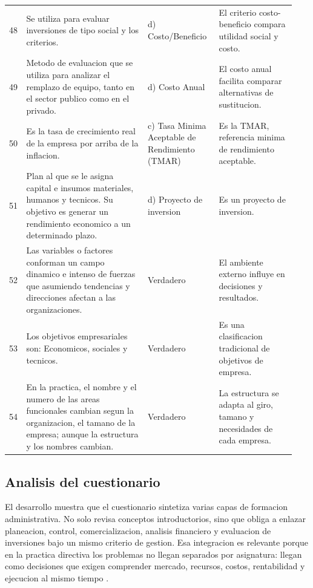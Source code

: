 \documentclass[
	spanish,
	letterpaper, oneside
]{article}
\begin{document}
\begin{landscape}
\begin{longtable}{@{}L{0.03\linewidth}L{0.41\linewidth}L{0.24\linewidth}L{0.26\linewidth}@{}}
48 & Se utiliza para evaluar inversiones de tipo social y los criterios. & d) Costo/Beneficio & El criterio costo-beneficio compara utilidad social y costo. \\
49 & Metodo de evaluacion que se utiliza para analizar el remplazo de equipo, tanto en el sector publico como en el privado. & d) Costo Anual & El costo anual facilita comparar alternativas de sustitucion. \\
50 & Es la tasa de crecimiento real de la empresa por arriba de la inflacion. & c) Tasa Minima Aceptable de Rendimiento (TMAR) & Es la TMAR, referencia minima de rendimiento aceptable. \\
51 & Plan al que se le asigna capital e insumos materiales, humanos y tecnicos. Su objetivo es generar un rendimiento economico a un determinado plazo. & d) Proyecto de inversion & Es un proyecto de inversion. \\
52 & Las variables o factores conforman un campo dinamico e intenso de fuerzas que asumiendo tendencias y direcciones afectan a las organizaciones. & Verdadero & El ambiente externo influye en decisiones y resultados. \\
53 & Los objetivos empresariales son: Economicos, sociales y tecnicos. & Verdadero & Es una clasificacion tradicional de objetivos de empresa. \\
54 & En la practica, el nombre y el numero de las areas funcionales cambian segun la organizacion, el tamano de la empresa; aunque la estructura y los nombres cambian. & Verdadero & La estructura se adapta al giro, tamano y necesidades de cada empresa. \\
\end{longtable}
\endgroup
\end{landscape}
\clearpage
\pagestyle{fancy}

\subsection{Analisis del cuestionario}

El desarrollo muestra que el cuestionario sintetiza varias capas de formacion administrativa. No solo revisa conceptos introductorios, sino que obliga a enlazar planeacion, control, comercializacion, analisis financiero y evaluacion de inversiones bajo un mismo criterio de gestion. Esa integracion es relevante porque en la practica directiva los problemas no llegan separados por asignatura: llegan como decisiones que exigen comprender mercado, recursos, costos, rentabilidad y ejecucion al mismo tiempo \citep{amelicaProcesoAdmin2019,snhuAdminMerca2023}.
\end{document}
